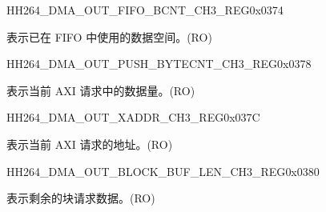     
    \begin{register}{H}{H264\_DMA\_OUT\_FIFO\_BCNT\_CH3\_REG}{0x0374}\label{regdesc:H264DMAOUTFIFOBCNTCH3REG}
    \regnewline%
    \begin{regdesc}\begin{reglist}
    \label{fielddesc:H264DMAOUTCMDFIFOOUTFIFOBCNTCH3}\item [H264\_DMA\_OUT\_CMDFIFO\_OUTFIFO\_BCNT\_CH3] 表示已在 FIFO 中使用的数据空间。(RO)
    \end{reglist}\end{regdesc}
    \end{register}
    
    
    \begin{register}{H}{H264\_DMA\_OUT\_PUSH\_BYTECNT\_CH3\_REG}{0x0378}\label{regdesc:H264DMAOUTPUSHBYTECNTCH3REG}
    \regnewline%
    \begin{regdesc}\begin{reglist}
    \label{fielddesc:H264DMAOUTCMDFIFOPUSHBYTECNTCH3}\item [H264\_DMA\_OUT\_CMDFIFO\_PUSH\_BYTECNT\_CH3] 表示当前 AXI 请求中的数据量。(RO)
    \end{reglist}\end{regdesc}
    \end{register}
    
    
    \begin{register}{H}{H264\_DMA\_OUT\_XADDR\_CH3\_REG}{0x037C}\label{regdesc:H264DMAOUTXADDRCH3REG}
    \regnewline%
    \begin{regdesc}\begin{reglist}
    \label{fielddesc:H264DMAOUTCMDFIFOXADDRCH3}\item [H264\_DMA\_OUT\_CMDFIFO\_XADDR\_CH3] 表示当前 AXI 请求的地址。(RO)
    \end{reglist}\end{regdesc}
    \end{register}
    
    
    \begin{register}{H}{H264\_DMA\_OUT\_BLOCK\_BUF\_LEN\_CH3\_REG}{0x0380}\label{regdesc:H264DMAOUTBLOCKBUFLENCH3REG}
    \regnewline%
    \begin{regdesc}\begin{reglist}
    \label{fielddesc:H264DMAOUTBLOCKBUFLENCH3}\item [H264\_DMA\_OUT\_BLOCK\_BUF\_LEN\_CH3] 表示剩余的块请求数据。(RO)
    \end{reglist}\end{regdesc}
    \end{register}
    
